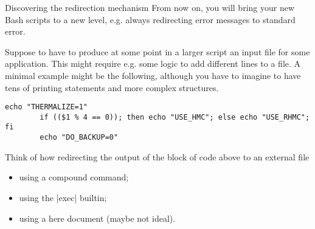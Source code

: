 
\begin{exercise}[Instructive]{Discovering the redirection mechanism}
    From now on, you will bring your new Bash scripts to a new level, e.g. always redirecting error messages to standard error.

    Suppose to have to produce at some point in a larger script an input file for some application.
    This might require e.g. some logic to add different lines to a file.
    A minimal example might be the following, although you have to imagine to have tens of printing statements and more complex structures.
    \begin{lstlisting}[style=myBash]
        echo "THERMALIZE=1"
        if (($1 % 4 == 0)); then echo "USE_HMC"; else echo "USE_RHMC"; fi
        echo "DO_BACKUP=0"
    \end{lstlisting}

    Think of how redirecting the output of the block of code above to an external file
    \begin{itemize}[nosep]
        \item using a compound command;
        \item using the \bash|exec| builtin;
        \item using a here document (maybe not ideal).
    \end{itemize}
\end{exercise}